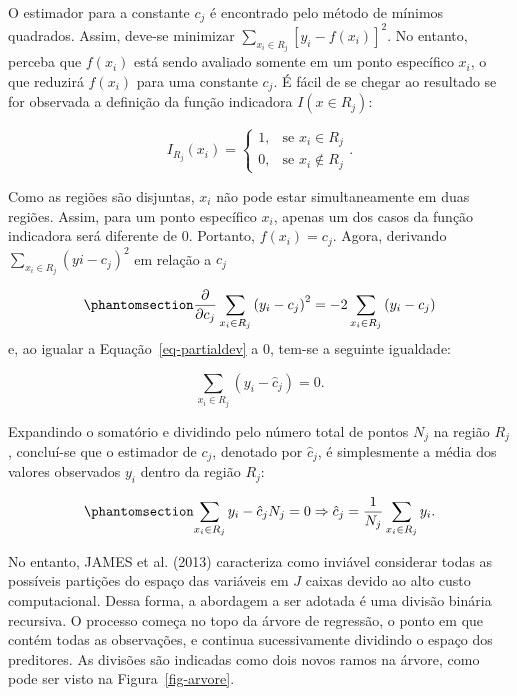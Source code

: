 \documentclass[
  12pt,
  a4paper,
]{scrreprt}
\begin{document}
O estimador para a constante \(c_j\) é encontrado pelo método de mínimos
quadrados. Assim, deve-se minimizar
\(\sum_{x_i \in R_j} \left[y_i - f\left(x_i\right)\right]^2\). No
entanto, perceba que \(f\left(x_i\right)\) está sendo avaliado somente
em um ponto específico \(x_i\), o que reduzirá \(f\left(x_i\right)\)
para uma constante \(c_j\). É fácil de se chegar ao resultado se for
observada a definição da função indicadora \(I\left(x \in R_j\right)\):

\[
I_{R_j}(x_i) =
\begin{cases}
    1,& \text{se } x_i \in R_j \\
    0,& \text{se } x_i \notin R_j
\end{cases}\text{.}
\]

Como as regiões são disjuntas, \(x_i\) não pode estar simultaneamente em
duas regiões. Assim, para um ponto específico \(x_i\), apenas um dos
casos da função indicadora será diferente de 0. Portanto,
\(f\left(x_i\right) = c_j\). Agora, derivando
\(\sum_{x_i \in R_j}\left(yi - c_j\right)^2\) em relação a \(c_j\)

\begin{equation}\phantomsection\label{eq-partialdev}{
\frac{\partial}{\partial{c_j}}\sum_{x_i \in R_j} \left(y_i - c_j\right)^2 = -2\sum_{x_i \in R_j} \left(y_i - c_j\right)
}\end{equation} e, ao igualar a Equação~\ref{eq-partialdev} a 0, tem-se
a seguinte igualdade:

\[
\sum_{x_i \in R_j} \left(y_i - \hat{c}_j\right) = 0\text{.}
\]

Expandindo o somatório e dividindo pelo número total de pontos \(N_j\)
na região \(R_j\), concluí-se que o estimador de \(c_j\), denotado por
\(\hat{c}_j\), é simplesmente a média dos valores observados \(y_i\)
dentro da região \(R_j\):

\begin{equation}\phantomsection\label{eq-estimacjdev}{
\sum_{x_i \in R_j} y_i - \hat{c}_j N_j = 0 \Rightarrow \hat{c}_j = \frac{1}{N_{j}}\sum_{x_i \in R_j} y_i\text{.}
}\end{equation}

\vspace{12pt}

No entanto, JAMES et al. (2013) caracteriza como inviável considerar
todas as possíveis partições do espaço das variáveis em \(J\) caixas
devido ao alto custo computacional. Dessa forma, a abordagem a ser
adotada é uma divisão binária recursiva. O processo começa no topo da
árvore de regressão, o ponto em que contém todas as observações, e
continua sucessivamente dividindo o espaço dos preditores. As divisões
são indicadas como dois novos ramos na árvore, como pode ser visto na
Figura~\ref{fig-arvore}.
\end{document}
